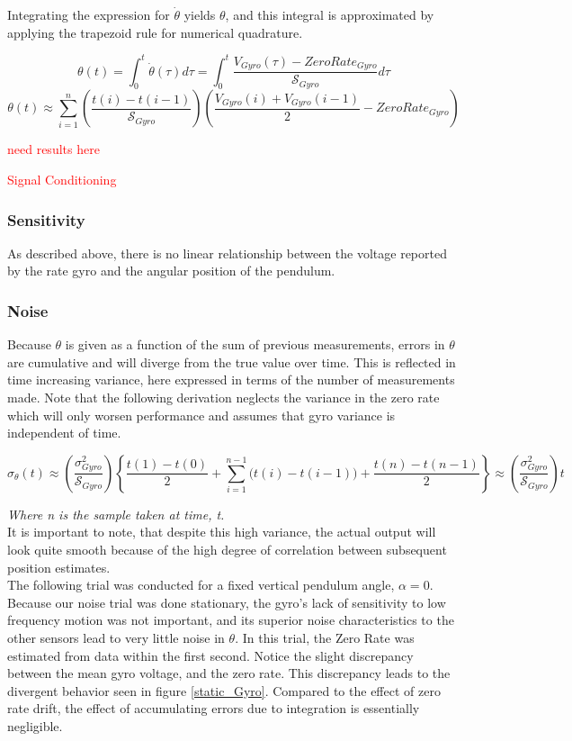 \documentclass{article}
\newcommand{\xxx}[1]{\textcolor{red}{#1}}
\theoremstyle{plain}
\theoremstyle{definition}
\theoremstyle{remark}
\newcommand{\Sens}{\mathcal{S}}
\begin{document}
Integrating the expression for $\dot{\theta}$ yields $\theta$, and this integral is approximated by applying the trapezoid rule for numerical quadrature.

$$ \theta(t) = \int_0^t \dot{\theta}(\tau) d\tau = \int_0^t \frac{V_{Gyro}(\tau) - ZeroRate_{Gyro}}{\Sens_{Gyro}} d\tau$$
$$ \theta(t) \approx \sum_{i=1}^n \left(\frac{t(i) - t(i-1)}{ \Sens_{Gyro}} \right) \left( \frac{V_{Gyro}(i) + V_{Gyro}(i - 1)}{2} - ZeroRate_{Gyro} \right) $$

\xxx{need results here}

\xxx{Signal Conditioning}

\subsubsection{Sensitivity}

As described above, there is no linear relationship between the voltage reported by the rate gyro and the angular position of the pendulum.  

\subsubsection{Noise}

Because $\theta$ is given as a function of the sum of previous measurements, errors in $\theta$ are cumulative and will diverge from the true value over time.  This is reflected in time increasing variance, here expressed in terms of the number of measurements made.  Note that the following derivation neglects the variance in the zero rate which will only worsen performance and assumes that gyro variance is independent of time.

$$ \sigma_{\theta}(t) \approx \left( \frac{\sigma_{Gyro}^2}{\Sens_{Gyro}} \right) \left\{ \frac{t(1) - t(0)}{2} + \sum_{i = 1}^{n-1} \big( t(i) - t(i-1) \big) + \frac{t(n) - t(n-1)}{2} \right\} \approx \left( \frac{\sigma_{Gyro}^2}{\Sens_{Gyro}} \right) t$$

\emph{Where n is the sample taken at time, t.} \\

It is important to note, that despite this high variance, the actual output will look quite smooth because of the high degree of correlation between subsequent position estimates.  \\

The following trial was conducted for a fixed vertical pendulum angle, $\alpha = 0$.  Because our noise trial was done stationary, the gyro's lack of sensitivity to low frequency motion was not important, and its superior noise characteristics to the other sensors lead to very little noise in $\theta$.  In this trial, the Zero Rate was estimated from data within the first second.  Notice the slight discrepancy between the mean gyro voltage, and the zero rate.  This discrepancy leads to the divergent behavior seen in figure \ref{static_Gyro}.   Compared to the effect of zero rate drift, the effect of accumulating errors due to integration is essentially negligible.  
\end{document}
